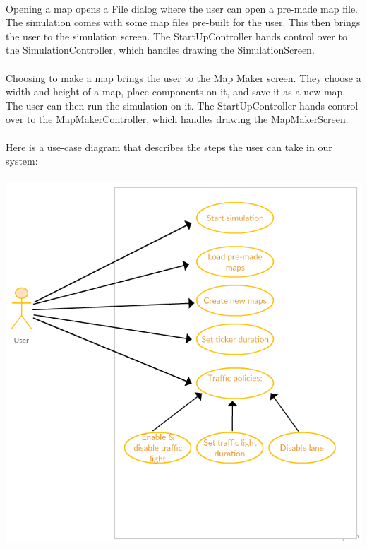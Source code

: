 \documentclass[a4paper,11pt,titlepage]{article}
\begin{document}
\paragraph{}
Opening a map opens a File dialog where the user can open a pre-made map file. The simulation comes with some map files pre-built for the user. This then brings the user to the simulation screen. The StartUpController hands control over to the SimulationController, which handles drawing the SimulationScreen. 
\paragraph{}
Choosing to make a map brings the user to the Map Maker screen. They choose a width and height of a map, place components on it, and save it as a new map. The user can then run the simulation on it. The StartUpController hands control over to the MapMakerController, which handles drawing the MapMakerScreen.
\paragraph{}
Here is a use-case diagram that describes the steps the user can take in our system:
\paragraph{}
\centerline{ \includegraphics[scale=0.5]{UseCase}}
\end{document}
